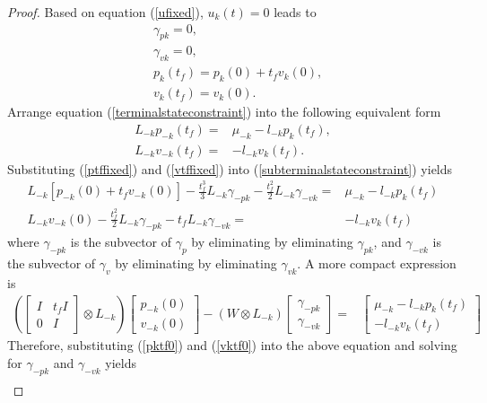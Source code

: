 \documentclass[12pt,draftcls,onecolumn]{IEEEtran}  %
\begin{document}
{\begin{proof}
Based on equation (\ref{ufixed}), $u_k(t)=0$ leads to
\begin{align}
&\gamma_{pk}=0, \label{gammapkfixed}\\
&\gamma_{vk}=0, \label{gammavkfixed}\\
&p_k(t_f)=p_k(0)+t_fv_k(0), \label{pktf0}\\
&v_k(t_f)=v_k(0). \label{vktf0}
\end{align}
Arrange equation (\ref{terminalstateconstraint}) into the following equivalent form
\begin{subequations}\label{subterminalstateconstraint}
\begin{align}
L_{-k}p_{-k}(t_f)=&\mu_{-k}-l_{-k}p_k(t_f),\\
L_{-k}v_{-k}(t_f)=&-l_{-k}v_k(t_f).
\end{align}
\end{subequations}
Substituting (\ref{ptffixed}) and (\ref{vtffixed}) into (\ref{subterminalstateconstraint}) yields
\begin{align}
L_{-k}[p_{-k}(0)+t_fv_{-k}(0)]-\frac{t_f^3}{3}L_{-k}\gamma_{-pk} -\frac{t_f^2}{2}L_{-k}\gamma_{-vk}=&\mu_{-k}-l_{-k}p_k(t_f)\\
L_{-k}v_{-k}(0)-\frac{t_f^2}{2}L_{-k}\gamma_{-pk} -t_fL_{-k}\gamma_{-vk}=&-l_{-k}v_k(t_f)
\end{align}
where $\gamma_{-pk}$ is the subvector of $\gamma_{p}$ by eliminating by eliminating $\gamma_{pk}$, and $\gamma_{-vk}$ is the subvector of $\gamma_{v}$ by eliminating by eliminating $\gamma_{vk}$. A more compact expression is
\begin{align}
\left(\begin{bmatrix}
I&t_fI\\
0&I
\end{bmatrix}\otimes L_{-k}\right)\begin{bmatrix}
p_{-k}(0)\\
v_{-k}(0)
\end{bmatrix}-
\left(W\otimes L_{-k}\right)\begin{bmatrix}
\gamma_{-pk}\\
\gamma_{-vk}
\end{bmatrix}=&\begin{bmatrix}
\mu_{-k}-l_{-k}p_k(t_f)\\
-l_{-k}v_k(t_f)
\end{bmatrix}
\end{align}
Therefore, substituting (\ref{pktf0}) and (\ref{vktf0}) into the above equation and solving for $\gamma_{-pk}$ and $\gamma_{-vk}$ yields
\begin{align}

\end{align}
\end{proof}}
\end{document}
